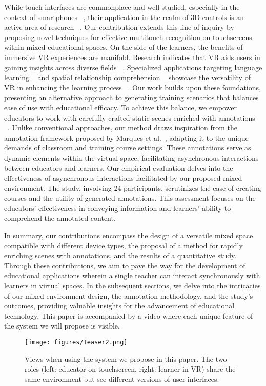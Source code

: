 While touch interfaces are commonplace and well-studied, especially in the context of smartphones ~\cite{gesturalInterfaces}, their application in the realm of 3D controls is an active area of research ~\cite{multiTouch3D}. Our contribution extends this line of inquiry by proposing novel techniques for effective multitouch recognition on touchscreens within mixed educational spaces.
%
On the side of the learners, the benefits of immersive VR experiences are manifold. Research indicates that VR aids users in gaining insights across diverse fields ~\cite{vrLearningSerious}. Specialized applications targeting language learning ~\cite{vrLearningLanguage} and spatial relationship comprehension ~\cite{vrLearningSpatial} showcase the versatility of VR in enhancing the learning process ~\cite{kowalewski2018laptrain,yiannakopoulou2015virtual,vrFasterLearning}. Our work builds upon these foundations, presenting an alternative approach to generating training scenarios that balances ease of use with educational efficacy.
%
To achieve this balance, we empower educators to work with carefully crafted static scenes enriched with annotations ~\cite{annotations1, annotations2}. Unlike conventional approaches, our method draws inspiration from the annotation framework proposed by Marques et al.~\cite{vuforiaAnnotations}, adapting it to the unique demands of classroom and training course settings. These annotations serve as dynamic elements within the virtual space, facilitating asynchronous interactions between educators and learners.
%
Our empirical evaluation delves into the effectiveness of asynchronous interactions facilitated by our proposed mixed environment. The study, involving 24 participants, scrutinizes the ease of creating courses and the utility of generated annotations. This assessment focuses on the educators' effectiveness in conveying information and learners' ability to comprehend the annotated content.

In summary, our contributions encompass the design of a versatile mixed space compatible with different device types, the proposal of a method for rapidly enriching scenes with annotations, and the results of a quantitative study. Through these contributions, we aim to pave the way for the development of educational applications wherein a single teacher can interact synchronously with learners in virtual spaces.
In the subsequent sections, we delve into the intricacies of our mixed environment design, the annotation methodology, and the study's outcomes, providing valuable insights for the advancement of educational technology. This paper is accompanied by a video where each unique feature of the system we will propose is visible.
\begin{figure}
 \centering
 \texttt{[image: figures/Teaser2.png]}
 \caption{Views when using the system we propose in this paper. The two roles (left: educator on touchscreen, right: learner in VR) share the same environment but see different versions of user interfaces.}
 \label{fig:teaser}
\end{figure}